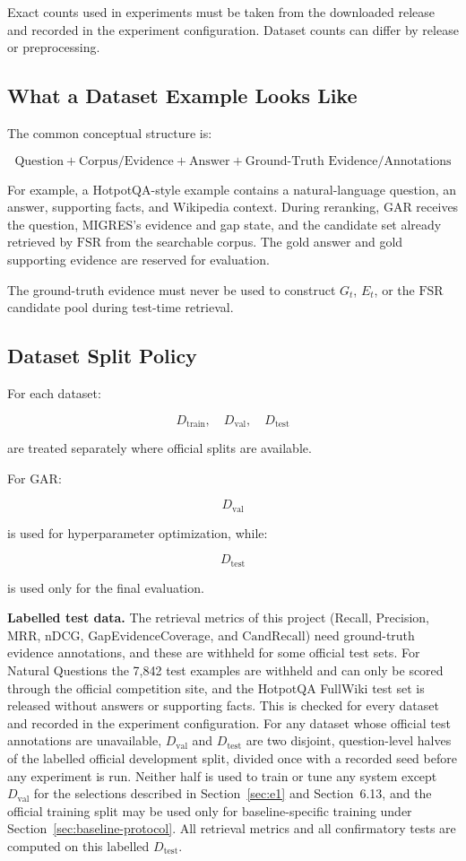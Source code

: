 \documentclass[11pt,a4paper]{article}
\begin{document}
Exact counts used in experiments must be taken from the downloaded release and recorded in the experiment configuration. Dataset counts can differ by release or preprocessing.

\subsection{What a Dataset Example Looks Like}

The common conceptual structure is:

\[
\boxed{
\text{Question}
+
\text{Corpus/Evidence}
+
\text{Answer}
+
\text{Ground-Truth Evidence/Annotations}
}
\]

For example, a HotpotQA-style example contains a natural-language question, an answer, supporting facts, and Wikipedia context. During reranking, GAR receives the question, MIGRES's evidence and gap state, and the candidate set already retrieved by $\mathrm{FSR}$ from the searchable corpus. The gold answer and gold supporting evidence are reserved for evaluation.

The ground-truth evidence must never be used to construct $G_t$, $E_t$, or the $\mathrm{FSR}$ candidate pool during test-time retrieval.

\subsection{Dataset Split Policy}

For each dataset:

\[
D_{\mathrm{train}},\quad
D_{\mathrm{val}},\quad
D_{\mathrm{test}}
\]

are treated separately where official splits are available.

For GAR:

\[
D_{\mathrm{val}}
\]

is used for hyperparameter optimization, while:

\[
D_{\mathrm{test}}
\]

is used only for the final evaluation.

\textbf{Labelled test data.} The retrieval metrics of this project (Recall, Precision, MRR, nDCG, GapEvidenceCoverage, and $\mathrm{CandRecall}$) need ground-truth evidence annotations, and these are withheld for some official test sets. For Natural Questions the 7,842 test examples are withheld and can only be scored through the official competition site, and the HotpotQA FullWiki test set is released without answers or supporting facts. This is checked for every dataset and recorded in the experiment configuration. For any dataset whose official test annotations are unavailable, $D_{\mathrm{val}}$ and $D_{\mathrm{test}}$ are two disjoint, question-level halves of the labelled official development split, divided once with a recorded seed before any experiment is run. Neither half is used to train or tune any system except $D_{\mathrm{val}}$ for the selections described in Section~\ref{sec:e1} and Section~6.13, and the official training split may be used only for baseline-specific training under Section~\ref{sec:baseline-protocol}. All retrieval metrics and all confirmatory tests are computed on this labelled $D_{\mathrm{test}}$.
\end{document}
